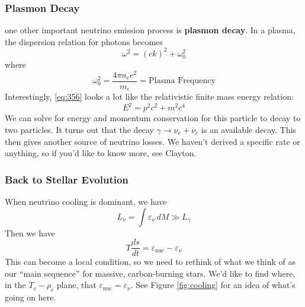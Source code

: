 \documentclass[10pt]{article}
\numberwithin{equation}{section}
\newcommand{\figref}[1]{Figure \ref{#1}}
\begin{document}
    \subsubsection{Plasmon Decay}
    \label{sec:plasmon-decay}

    one other important neutrino emission process is \textbf{plasmon
      decay}. In a plasma, the dispersion relation for photons becomes
    \begin{equation}
      \label{eq:356}
      \omega^2=(ck)^2+\omega_0^2
    \end{equation}
    where 
    \begin{equation}
      \label{eq:357}
      \omega_0^2=\frac{4\pi n_e e^2}{m_e}=\textrm{Plasma Frequency}
    \end{equation}
    Interestingly, \eqref{eq:356} looks a lot like the relativistic
    finite mass energy relation:
    \begin{equation}
      \label{eq:358}
      E^2=p^2c^2+m^2 c^4
    \end{equation}
    We can solve for energy and momentum conservation for this particle
    to decay to two particles. It turns out that the decay $\gamma\to
    \nu_e + \overline{\nu}_e$ is an available decay. This then gives
    another source of neutrino losses. We haven't derived a specific
    rate or anything, so if you'd like to know more, see Clayton.

    \subsubsection{Back to Stellar Evolution}
    \label{sec:back-stell-evol}

    When neutrino cooling is dominant, we have
    \begin{equation}
      \label{eq:359}
      L_\nu=\int \varepsilon_\nu\,dM\gg L_\gamma
    \end{equation}
    Then we have
    \begin{equation}
      \label{eq:360}
      T\frac{ds}{dt}=\varepsilon_{\mathrm{nuc}}-\varepsilon_\nu
    \end{equation}
    This can become a local condition, so we need to rethink of what
    we think of as our ``main sequence'' for massive, carbon-burning
    stars. We'd like to find where, in the $T_c-\rho_c$ plane, that
    $\varepsilon_{\mathrm{nuc}}=\varepsilon_\nu$. See
    \figref{fig:cooling} for an idea of what's going on here.\\
\end{document}

